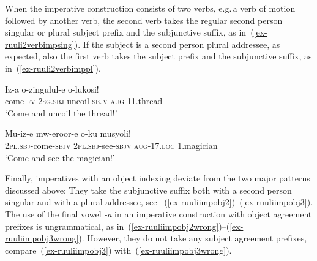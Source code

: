When the imperative construction consists of two verbs, e.g.\,a verb of motion followed by another verb, the second verb takes the regular second person singular or plural subject prefix and the subjunctive suffix, as in~(\ref{ex-ruuli2verbimpsing}). 
If the subject is a second person plural addressee, as expected, also the first verb takes the subject prefix and the subjunctive suffix, as in~(\ref{ex-ruuli2verbimppl}). 

\ea 
\begin{xlist}
\ex \label{ex-ruuli2verbimpsing}
	\gll Iz-a o-zingulul-e o-lukosi!\\
		come-\textsc{fv} 2\textsc{sg.sbj}-uncoil-\textsc{sbjv} \textsc{aug}-11.thread\\
\glt ‘Come and uncoil the thread!’ 

	\ex \label{ex-ruuli2verbimppl}
	\gll Mu-iz-e mw-eroor-e 			o-ku musyoli!\\
		2\textsc{pl.sbj}-come-\textsc{sbjv} 2\textsc{pl.sbj}-see-\textsc{sbjv}	\textsc{aug}-17.\textsc{loc} 1.magician\\
\glt ‘Come and see the magician!’ 
\end{xlist}
\z

Finally, imperatives with an object indexing deviate from the two major patterns discussed above: 
They take the subjunctive suffix both with a second person singular and with a plural addressee, see~ (\ref{ex-ruuliimpobj2})--(\ref{ex-ruuliimpobj3}). 
The use of the final vowel \emph{-a} in an imperative construction with object agreement prefixes is ungrammatical, as in~(\ref{ex-ruuliimpobj2wrong})--(\ref{ex-ruuliimpobj3wrong}). 
However, they do not take any subject agreement prefixes, compare~(\ref{ex-ruuliimpobj3}) with~(\ref{ex-ruuliimpobj3wrong}).

